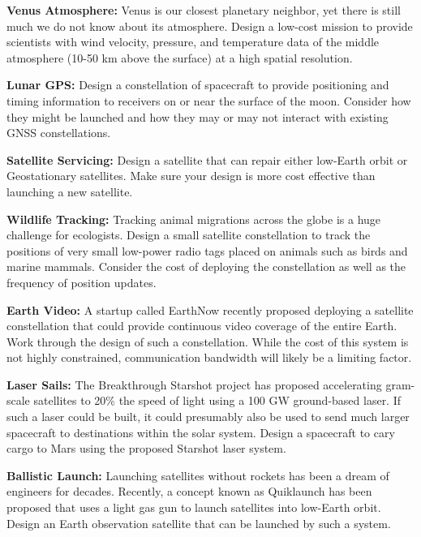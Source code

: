\documentclass[11pt,letterpaper]{article}
\begin{document}
\medskip
\noindent
\textbf{Venus Atmosphere:} Venus is our closest planetary neighbor, yet there is still much we do not know about its atmosphere. Design a low-cost mission to provide scientists with wind velocity, pressure, and temperature data of the middle atmosphere (10-50 km above the surface) at a high spatial resolution.

\medskip
\noindent
\textbf{Lunar GPS:} Design a constellation of spacecraft to provide positioning and timing information to receivers on or near the surface of the moon. Consider how they might be launched and how they may or may not interact with existing GNSS constellations.

\medskip
\noindent
\textbf{Satellite Servicing:} Design a satellite that can repair either low-Earth orbit or Geostationary satellites. Make sure your design is more cost effective than launching a new satellite.

\medskip
\noindent
\textbf{Wildlife Tracking:} Tracking animal migrations across the globe is a huge challenge for ecologists. Design a small satellite constellation to track the positions of very small low-power radio tags placed on animals such as birds and marine mammals. Consider the cost of deploying the constellation as well as the frequency of position updates.

\medskip
\noindent
\textbf{Earth Video:} A startup called EarthNow recently proposed deploying a satellite constellation that could provide continuous video coverage of the entire Earth. Work through the design of such a constellation. While the cost of this system is not highly constrained, communication bandwidth will likely be a limiting factor.

\medskip
\noindent
\textbf{Laser Sails:} The Breakthrough Starshot project has proposed accelerating gram-scale satellites to 20\% the speed of light using a 100 GW ground-based laser. If such a laser could be built, it could presumably also be used to send much larger spacecraft to destinations within the solar system. Design a spacecraft to cary cargo to Mars using the proposed Starshot laser system.

\medskip
\noindent
\textbf{Ballistic Launch:} Launching satellites without rockets has been a dream of engineers for decades. Recently, a concept known as Quiklaunch has been proposed that uses a light gas gun to launch satellites into low-Earth orbit. Design an Earth observation satellite that can be launched by such a system.
\end{document}
